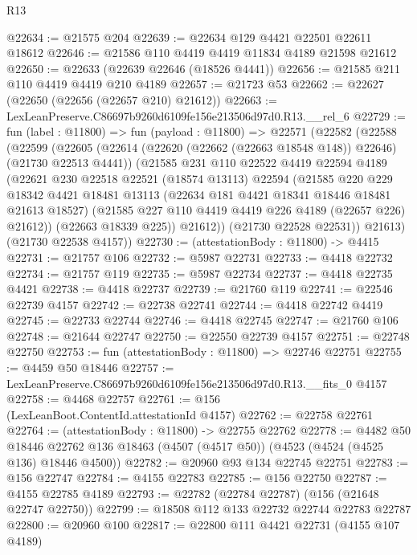 \begin{lexlean}{R13}
\begin{coremodule}
@22634 := @21575 @204
@22639 := @22634 @129 @4421 @22501 @22611 @18612
@22646 := @21586 @110 @4419 @4419 @11834 @4189 @21598 @21612
@22650 := @22633 (@22639 @22646 (@18526 @4441))
@22656 := @21585 @211 @110 @4419 @4419 @210 @4189
@22657 := @21723 @53
@22662 := @22627 (@22650 (@22656 (@22657 @210) @21612))
@22663 := LexLeanPreserve.C86697b9260d6109fe156e213506d97d0.R13.__rel_6
@22729 := fun (label : @11800) =>
  fun (payload : @11800) =>
  @22571
    (@22582
      (@22588
        (@22599
          (@22605
            (@22614 (@22620 (@22662 (@22663 @18548 @148)) @22646) (@21730 @22513 @4441))
            (@21585
              @231
              @110
              @22522
              @4419
              @22594
              @4189
              (@22621
                @230
                @22518
                @22521
                (@18574 @13113)
                @22594
                (@21585
                  @220
                  @229
                  @18342
                  @4421
                  @18481
                  @13113
                  (@22634 @181 @4421 @18341 @18446 @18481 @21613 @18527)
                  (@21585 @227 @110 @4419 @4419 @226 @4189 (@22657 @226) @21612))
                (@22663 @18339 @225))
              @21612))
          (@21730 @22528 @22531))
        @21613)
      (@21730 @22538 @4157))
@22730 := (attestationBody : @11800) -> @4415
@22731 := @21757 @106
@22732 := @5987 @22731
@22733 := @4418 @22732
@22734 := @21757 @119
@22735 := @5987 @22734
@22737 := @4418 @22735 @4421
@22738 := @4418 @22737
@22739 := @21760 @119
@22741 := @22546 @22739 @4157
@22742 := @22738 @22741
@22744 := @4418 @22742 @4419
@22745 := @22733 @22744
@22746 := @4418 @22745
@22747 := @21760 @106
@22748 := @21644 @22747
@22750 := @22550 @22739 @4157
@22751 := @22748 @22750
@22753 := fun (attestationBody : @11800) => @22746 @22751
@22755 := @4459 @50 @18446
@22757 := LexLeanPreserve.C86697b9260d6109fe156e213506d97d0.R13.__fits_0 @4157
@22758 := @4468 @22757
@22761 := @156 (LexLeanBoot.ContentId.attestationId @4157)
@22762 := @22758 @22761
@22764 := (attestationBody : @11800) -> @22755 @22762
@22778 := @4482
    @50
    @18446
    @22762
    @136
    @18463
    (@4507 (@4517 @50))
    (@4523 (@4524 (@4525 @136) @18446 @4500))
@22782 := @20960 @93 @134 @22745 @22751
@22783 := @156 @22747
@22784 := @4155 @22783
@22785 := @156 @22750
@22787 := @4155 @22785 @4189
@22793 := @22782 (@22784 @22787) (@156 (@21648 @22747 @22750))
@22799 := @18508 @112 @133 @22732 @22744 @22783 @22787
@22800 := @20960 @100
@22817 := @22800
    @111
    @4421
    @22731
    (@4155 @107 @4189)

\end{coremodule}
\end{lexlean}
